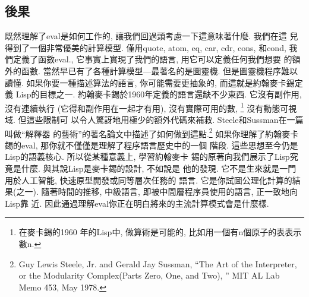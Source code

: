 \documentclass[12pt]{article}
\begin{document}
\begin{CJK}{UTF8}{bsmi}
\section{後果} 
既然理解了eval是如何工作的, 
讓我們回過頭考慮一下這意味著什麼. 
我們在這 
兒得到了一個非常優美的計算模型. 
僅用quote, atom, eq, car, cdr, cons, 和cond, 
我們定義了函數eval., 它事實上實現了我們的語言, 用它可以定義任何我們想要 
的額外的函數. 
當然早已有了各種計算模型---最著名的是圖靈機. 
但是圖靈機程序難以讀懂. 
如果你要一種描述算法的語言, 
你可能需要更抽象的, 
而這就是約翰麥卡錫定義 
Lisp的目標之一. 
約翰麥卡錫於1960年定義的語言還缺不少東西. 
它沒有副作用, 
沒有連續執行 
(它得和副作用在一起才有用), 
沒有實際可用的數, \footnote{在麥卡錫的1960 
年的Lisp中, 
做算術是可能的, 
比如用一個有n個原子的表表示數n.} 
沒有動態可視域. 
但這些限制可 
以令人驚訝地用極少的額外代碼來補救. 
Steele和Sussman在一篇叫做``解釋器 
的藝術''的著名論文中描述了如何做到這點.\footnote{Guy 
Lewis 
Steele, 
Jr. 
and 
Gerald 
Jay 
Sussman, 
``The 
Art 
of 
the 
Interpreter, 
or 
the 
Modularity 
Complex(Parts 
Zero, One, and 
Two), '' 
MIT 
AL 
Lab 
Memo 
453, 
May 
1978.} 
如果你理解了約翰麥卡錫的eval, 
那你就不僅僅是理解了程序語言歷史中的一個 
階段. 
這些思想至今仍是Lisp的語義核心. 
所以從某種意義上, 
學習約翰麥卡 
錫的原著向我們展示了Lisp究竟是什麼. 
與其說Lisp是麥卡錫的設計, 不如說是 
他的發現. 
它不是生來就是一門用於人工智能, 
快速原型開發或同等層次任務的 
語言. 
它是你試圖公理化計算的結果(之一). 
隨著時間的推移, 
中級語言, 
即被中間層程序員使用的語言, 
正一致地向Lisp靠 
近. 
因此通過理解eval你正在明白將來的主流計算模式會是什麼樣. 

\end{CJK}
\end{document}
